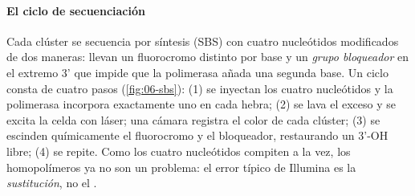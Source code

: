 \paragraph{El ciclo de secuenciación} Cada clúster se secuencia por síntesis (SBS) con cuatro nucleótidos modificados de dos maneras: llevan un fluorocromo distinto por base y un \emph{grupo bloqueador} en el extremo 3' que impide que la polimerasa añada una segunda base. Un ciclo consta de cuatro pasos (\cref{fig:06-sbs}): (1) se inyectan los cuatro nucleótidos y la polimerasa incorpora exactamente uno en cada hebra; (2) se lava el exceso y se excita la celda con láser; una cámara registra el color de cada clúster; (3) se escinden químicamente el fluorocromo y el bloqueador, restaurando un 3'-OH libre; (4) se repite. Como los cuatro nucleótidos compiten a la vez, los homopolímeros ya no son un problema: el error típico de Illumina es la \emph{sustitución}, no el .

